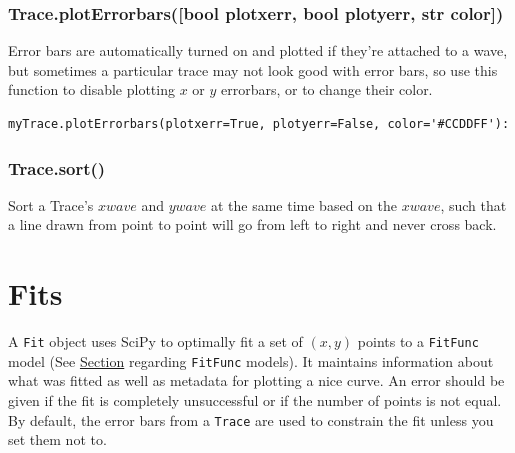 \documentclass[10pt]{report}
\begin{document}
\subsubsection*{Trace.\textbf{plotErrorbars}({\color{args}[bool \textbf{plotxerr}, bool \textbf{plotyerr}, str \textbf{color}]})}\label{func:ploterrbars}
Error bars are automatically turned on and plotted if they're attached to a wave, but sometimes a particular trace may not look good with error bars, so use this function to disable plotting $x$ or $y$ errorbars, or to change their color.
\begin{lstlisting}[caption=Error Bars on Trace After Creation]
myTrace.plotErrorbars(plotxerr=True, plotyerr=False, color='#CCDDFF'):
\end{lstlisting}


\subsubsection*{Trace.\textbf{sort}({\color{args}})}
Sort a Trace's $xwave$ and $ywave$ at the same time based on the $xwave$, such that a line drawn from point to point will go from left to right and never cross back.






\clearpage
\section{Fits}\label{sec:fits}
A \texttt{Fit} object uses SciPy to optimally fit a set of $(x, y)$ points to a \texttt{FitFunc} model (See \hyperref[sec:fitfuncs]{Section} regarding \texttt{FitFunc} models). It maintains information about what was fitted as well as metadata for plotting a nice curve. An error should be given if the fit is completely unsuccessful or if the number of points is not equal. By default, the error bars from a \texttt{Trace} are used to constrain the fit unless you set them not to.
\end{document}
